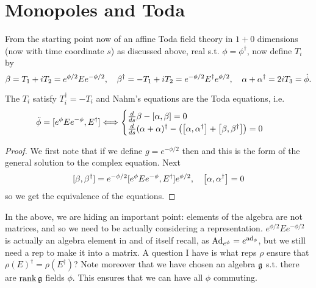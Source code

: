 \documentclass{article}
\begin{document}


\section{Monopoles and Toda}
From the starting point now of an affine Toda field theory in $1+0$ dimensions (now with time coordinate $s$) as discussed above, real s.t. $\phi=\phi^\dagger$, now define $T_i$ by 
$$
\beta=T_1+i T_2=e^{\phi/2} E e^{-\phi/2},\quad
\beta\sp\dagger=-T_1+i T_2=e^{-\phi/2} E\sp\dagger e^{\phi/2},\quad
\alpha+\alpha\sp\dagger=2i T_3 =\dot \phi.
$$

\begin{prop}
	The $T_i$ satisfy $T_i^\dagger = -T_i$ and Nahm's equations are the Toda equations, i.e.
\begin{align*}
\def\arraystretch{3.2}
\ddot\phi&=[ e^{\phi}E  e^{-\phi} ,E\sp\dagger ] 
\Longleftrightarrow  \begin{cases}
\frac{d}{ds}\beta - \comm[\alpha]{\beta} = 0 \\
\frac{d}{ds}(\alpha + \alpha)^\dagger - \pround{\comm[\alpha]{\alpha^\dagger} + \comm[\beta]{\beta^\dagger}} = 0
\end{cases}
\end{align*}
\end{prop}
\begin{proof}
We first note that if we define $g = e^{-\phi/2}$ then 
and this is the form of the general solution to the complex equation. Next 
	$$[\beta, \beta\sp\dagger]=e^{-\phi/2}[ e^{\phi}E  e^{-\phi} ,E\sp\dagger ]  e^{\phi/2}, \quad \comm[\alpha]{\alpha^\dagger}=0
	$$
so we get the equivalence of the equations. 
\end{proof}

\begin{remark}
	In the above, we are hiding an important point: elements of the algebra are not matrices, and so we need to be actually considering a representation. $e^{\phi/2}Ee^{-\phi/2}$ is actually an algebra element in and of itself recall, as $\Ad_{e^{\phi}} = e^{\ad_\phi}$, but we still need a rep to make it into a matrix. A question I have is what reps $\rho$ ensure that $\rho(E)^\dagger = \rho(E^\dagger)$? Note moreover that we have chosen an algebra $\mf{g}$ s.t. there are $\rank \mf{g}$ fields $\phi$. This ensures that we can have all $\phi$ commuting.  
\end{remark}
\end{document}

